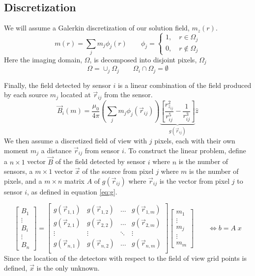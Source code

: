 \documentclass[a4paper]{article}
\begin{document}
\subsection{Discretization}

We will assume a Galerkin discretization of our solution field, $m_z(r)$.
\[
  m(r) = \sum_j m_j \phi_j  (r)
   \qquad 
  \phi_j = 
   \left\{ \begin{split}
     1, \quad r \in    \Omega_j \\
     0, \quad r \notin \Omega_j
   \end{split}
   \right.
\]
Here the imaging domain, $\Omega$, is decomposed into disjoint pixels,
$\Omega_j$
\[
   \Omega = \cup_j \Omega_j
  \qquad
   \Omega_i  \cap \Omega_j = \emptyset
\]


Finally, the field detected by sensor $i$ is a linear combination of the
field produced by each source $m_j$ 
located at $\vec{r}_{ij}$ from
the sensor. 
 \[
\vec{B}_i(m)=\frac{\mu_{0}}{4\pi}
  \left(\sum_j m_j \phi_j  (\vec{r}_{ij})\right)
  \underbrace{
   \left[
       \frac{r_{z_{ij}}^{2}}{r^{5}_{ij}}-\frac{1}{r^{3}_{ij}}
   \right]
   }_{g(\vec{r}_{ij})}
 \hat{z}
\]
We then assume a discretized field of view with $j$ pixels, each with their own moment $m_{j}$ a distance $\vec{r}_{ij}$ from sensor $i$.  To construct the linear problem, define a $n\times1$ vector $\vec{B}$ of the field detected by sensor $i$ where $n$ is the number of sensors, a $m\times1$ vector $\vec{x}$ of the source from pixel $j$ where $m$ is the number of pixels, and a $m\times n$ matrix $A$ of $g(\vec{r}_{ij})$ where $\vec{r}_{ij}$ is the vector from pixel $j$ to sensor $i$, as defined in equation \ref{eq:g}.

\begin{equation}
\begin{bmatrix}
B_{1}\\  
\vdots\\ 
B_{i}\\
\vdots\\
B_{n}
\end{bmatrix}
=
\begin{bmatrix} \label{eq:fullMatrix}
g(\vec{r}_{1,1}) & g(\vec{r}_{1,2}) & \dots  & g(\vec{r}_{1,m}) \\
g(\vec{r}_{2,1}) & g(\vec{r}_{2,2}) & \dots & g(\vec{r}_{2,m})\\
\vdots & \vdots & \ddots & \vdots\\
g(\vec{r}_{n,1}) & g(\vec{r}_{n,2}) & \hdots & g(\vec{r}_{n,m})\\
\end{bmatrix} 
\begin{bmatrix}
m_{1} \\ \vdots \\ m_{j} \\ \vdots \\ m_{m}
\end{bmatrix}
\qquad
\Leftrightarrow
b = A \; x
\end{equation}
Since the location of the detectors with respect to the field of view grid points is defined, $\vec{x}$ is the only unknown.  
\end{document}
